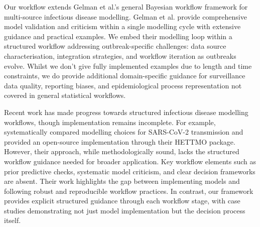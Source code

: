\documentclass{article}
\begin{document}

Our workflow extends Gelman et al.'s general Bayesian workflow framework \citep{gelman2020bayesian} for multi-source infectious disease modelling.
 Gelman et al. provide comprehensive model validation and criticism within a single modelling cycle with extensive guidance and practical examples.
We embed their modelling  loop within a structured workflow addressing outbreak-specific challenges: data source characterisation, integration strategies, and workflow iteration as outbreaks evolve. 
Whilst we don't give fully implemented examples due to length and time constraints, we do provide additional domain-specific guidance for surveillance data quality, reporting biases, and epidemiological process representation not covered in general statistical workflows.
 
Recent work has made progress towards structured infectious disease modelling workflows, though implementation remains incomplete.
For example, \citet{bouman2024bayesian} systematically compared modelling choices for SARS-CoV-2 transmission and provided an open-source implementation through their HETTMO package.
However, their approach, while methodologically sound, lacks the structured workflow guidance needed for broader application.
Key workflow elements such as prior predictive checks, systematic model criticism, and clear decision frameworks are absent.
Their work highlights the gap between implementing models and following robust and reproducible workflow practices.
In contrast, our framework provides explicit structured guidance through each workflow stage, with case studies demonstrating not just model implementation but the decision process itself.

\end{document}
